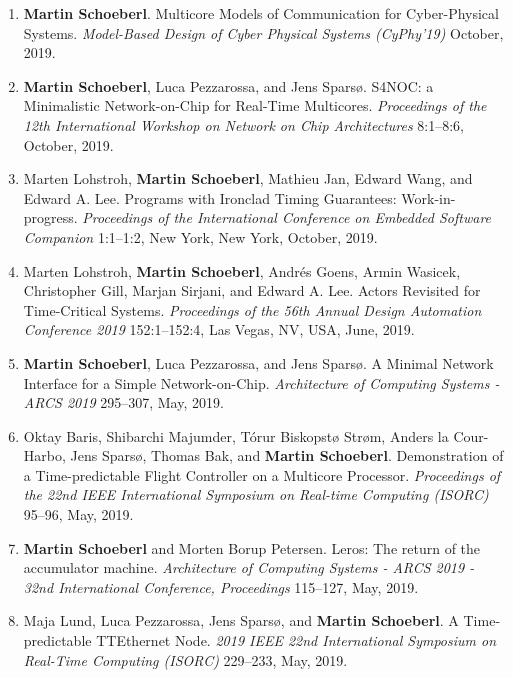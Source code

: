 \begin{enumerate}
\item {\bf Martin Schoeberl}.
 Multicore Models of Communication for Cyber-Physical Systems.
 \emph{Model-Based Design of Cyber Physical Systems (CyPhy'19)} October, 2019.

\item {\bf Martin Schoeberl}, Luca Pezzarossa, and Jens Spars{\o}.
 S4NOC: a Minimalistic Network-on-Chip for Real-Time Multicores.
 \emph{Proceedings of the 12th International Workshop on Network on Chip Architectures} 8:1--8:6, October, 2019.

\item Marten Lohstroh, {\bf Martin Schoeberl}, Mathieu Jan, Edward Wang, and Edward A. Lee.
 Programs with Ironclad Timing Guarantees: Work-in-progress.
 \emph{Proceedings of the International Conference on Embedded Software Companion} 1:1--1:2, New York, New York, October, 2019.

\item Marten Lohstroh, {\bf Martin Schoeberl}, Andr{\'e}s Goens, Armin Wasicek, Christopher Gill, Marjan Sirjani, and Edward A. Lee.
 Actors Revisited for Time-Critical Systems.
 \emph{Proceedings of the 56th Annual Design Automation Conference 2019} 152:1--152:4, Las Vegas, NV, USA, June, 2019.

\item {\bf Martin Schoeberl}, Luca Pezzarossa, and Jens Spars{\o}.
 A Minimal Network Interface for a Simple Network-on-Chip.
 \emph{Architecture of Computing Systems - ARCS 2019} 295--307, May, 2019.

\item Oktay Baris, Shibarchi Majumder, T{\'o}rur Biskopst{\o} Str{\o}m, Anders la Cour-Harbo, Jens Spars{\o}, Thomas Bak, and {\bf Martin Schoeberl}.
 Demonstration of a Time-predictable Flight Controller on a Multicore Processor.
 \emph{Proceedings of the 22nd IEEE International Symposium on Real-time Computing (ISORC)} 95--96, May, 2019.

\item {\bf Martin Schoeberl} and {Morten Borup} Petersen.
 Leros: The return of the accumulator machine.
 \emph{Architecture of Computing Systems - ARCS 2019 - 32nd International Conference, Proceedings} 115--127, May, 2019.

\item Maja Lund, Luca Pezzarossa, Jens Spars{\o}, and {\bf Martin Schoeberl}.
 A Time-predictable TTEthernet Node.
 \emph{2019 IEEE 22nd International Symposium on Real-Time Computing (ISORC)} 229--233, May, 2019.


\end{enumerate}
